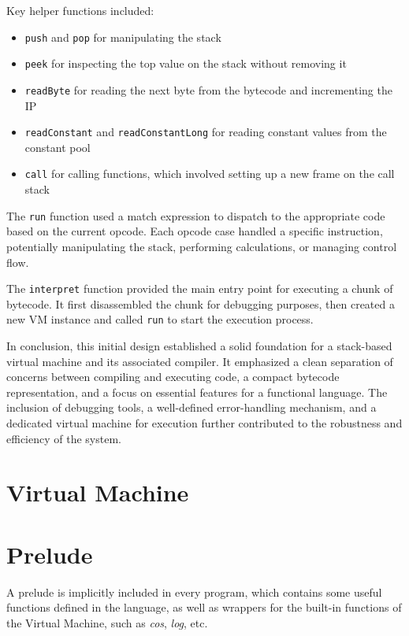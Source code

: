 Key helper functions included:

\begin{itemize}
    \item \texttt{push} and \texttt{pop} for manipulating the stack
    \item \texttt{peek} for inspecting the top value on the stack without removing it
    \item \texttt{readByte} for reading the next byte from the bytecode and incrementing the IP
    \item \texttt{readConstant} and \texttt{readConstantLong} for reading constant values from the constant pool
    \item \texttt{call} for calling functions, which involved setting up a new frame on the call stack
\end{itemize}

The \texttt{run} function used a match expression to dispatch to the appropriate code based on the current opcode.
Each opcode case handled a specific instruction, potentially manipulating the stack, performing calculations, or managing control flow.

The \texttt{interpret} function provided the main entry point for executing a chunk of bytecode.
It first disassembled the chunk for debugging purposes, then created a new VM instance and called \texttt{run} to start the execution process.

In conclusion, this initial design established a solid foundation for a stack-based virtual machine and its associated compiler.
It emphasized a clean separation of concerns between compiling and executing code, a compact bytecode representation, and a focus on essential features for a functional language. The inclusion of debugging tools, a well-defined error-handling mechanism, and a dedicated virtual machine for execution further contributed to the robustness and efficiency of the system.

\section{Virtual Machine}\label{sec:virtual-machine}

\section{Prelude}\label{sec:prelude}

A prelude is implicitly included in every program, which contains some useful functions defined in the language, as 
well as wrappers for the built-in functions of the Virtual Machine, such as \textit{cos}, \textit{log}, etc.

